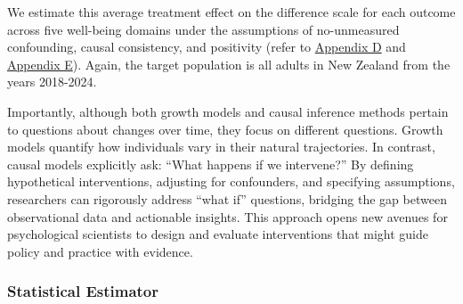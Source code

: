 \documentclass[
  single column]{article}
\begin{document}
We estimate this average treatment effect on the difference scale for
each outcome across five well-being domains under the assumptions of
no-unmeasured confounding, causal consistency, and positivity (refer to
\hyperref[appendix-assumptions]{Appendix D} and
\hyperref[appendix-transition]{Appendix E}). Again, the target
population is all adults in New Zealand from the years 2018-2024.

Importantly, although both growth models and causal inference methods
pertain to questions about changes over time, they focus on different
questions. Growth models quantify how individuals vary in their natural
trajectories. In contrast, causal models explicitly ask: ``What happens
if we intervene?'' By defining hypothetical interventions, adjusting for
confounders, and specifying assumptions, researchers can rigorously
address ``what if'' questions, bridging the gap between observational
data and actionable insights. This approach opens new avenues for
psychological scientists to design and evaluate interventions that might
guide policy and practice with evidence.

\subsubsection{Statistical Estimator}\label{statistical-estimator}
\end{document}
